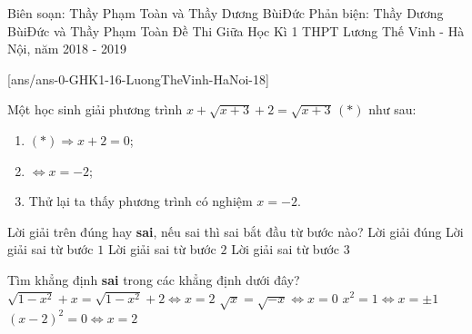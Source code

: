 \begin{name}
	{Biên soạn: Thầy Phạm Toàn và Thầy Dương BùiĐức Phản biện: Thầy Dương BùiĐức và Thầy Phạm Toàn}
	{Đề Thi Giữa Học Kì 1 THPT Lương Thế Vinh - Hà Nội, năm 2018 - 2019}
\end{name}
[ans/ans-0-GHK1-16-LuongTheVinh-HaNoi-18]
\begin{ex}%
	Một học sinh giải phương trình $x+ \sqrt{x+3}+2= \sqrt{x+3} \, (*)$  như sau:
	\begin{enumerate}[Bước 1.]
		\item $(*) \Rightarrow x + 2 = 0$;
		\item $\Leftrightarrow x= -2$;
		\item Thử lại ta thấy phương trình có nghiệm $x=-2$.
	\end{enumerate}
	Lời giải trên đúng hay \textbf{sai}, nếu sai thì sai bắt đầu từ bước nào?
	\choice
	{\True Lời giải đúng}
	{Lời giải sai từ bước $ 1 $}
	{Lời giải sai từ bước $ 2 $}
	{Lời giải sai từ bước $ 3 $}
\end{ex}
\begin{ex}%
	Tìm khẳng định {\bf sai} trong các khẳng định dưới đây?
	\choice
	{\True $\sqrt{1-x^2}+x=\sqrt{1-x^2}+2 \Leftrightarrow x=2$}
	{$\sqrt{x}=\sqrt{-x} \Leftrightarrow x=0$}
	{ $x^2=1 \Leftrightarrow x=\pm 1$}
	{$(x-2)^2=0 \Leftrightarrow x=2$}
\end{ex}
